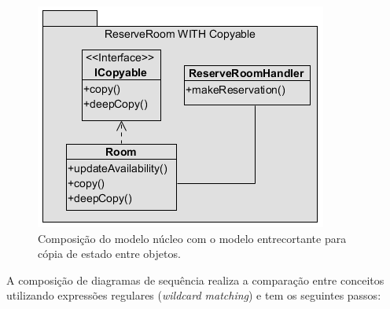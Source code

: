   \begin{figure}[!h]
	\centering
	\includegraphics{img/structural_composition_example.png}
	\caption{Composição do modelo núcleo com o modelo entrecortante para cópia de estado entre objetos.}\label{fig:structural_composition_example}
  \end{figure}

A composição de diagramas de sequência realiza a comparação entre conceitos utilizando expressões regulares (\textit{wildcard matching}) e tem os
seguintes passos:
  
